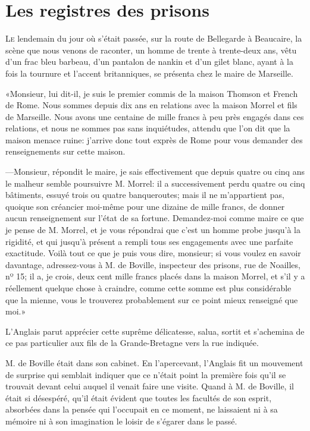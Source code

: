 \chapter{Les registres des prisons}

\lettrine{L}{e} lendemain du jour où s'était passée, sur la route de Bellegarde à Beaucaire, la scène que nous venons de raconter, un homme de trente à trente-deux ans, vêtu d'un frac bleu barbeau, d'un pantalon de nankin et d'un gilet blanc, ayant à la fois la tournure et l'accent britanniques, se présenta chez le maire de Marseille.

«Monsieur, lui dit-il, je suis le premier commis de la maison Thomson et French de Rome. Nous sommes depuis dix ans en relations avec la maison Morrel et fils de Marseille. Nous avons une centaine de mille francs à peu près engagés dans ces relations, et nous ne sommes pas sans inquiétudes, attendu que l'on dit que la maison menace ruine: j'arrive donc tout exprès de Rome pour vous demander des renseignements sur cette maison.

—Monsieur, répondit le maire, je sais effectivement que depuis quatre ou cinq ans le malheur semble poursuivre M. Morrel: il a successivement perdu quatre ou cinq bâtiments, essuyé trois ou quatre banqueroutes; mais il ne m'appartient pas, quoique son créancier moi-même pour une dizaine de mille francs, de donner aucun renseignement sur l'état de sa fortune. Demandez-moi comme maire ce que je pense de M. Morrel, et je vous répondrai que c'est un homme probe jusqu'à la rigidité, et qui jusqu'à présent a rempli tous ses engagements avec une parfaite exactitude. Voilà tout ce que je puis vous dire, monsieur; si vous voulez en savoir davantage, adressez-vous à M. de Boville, inspecteur des prisons, rue de Noailles, nº 15; il a, je crois, deux cent mille francs placés dans la maison Morrel, et s'il y a réellement quelque chose à craindre, comme cette somme est plus considérable que la mienne, vous le trouverez probablement sur ce point mieux renseigné que moi.»

L'Anglais parut apprécier cette suprême délicatesse, salua, sortit et s'achemina de ce pas particulier aux fils de la Grande-Bretagne vers la rue indiquée.

M. de Boville était dans son cabinet. En l'apercevant, l'Anglais fit un mouvement de surprise qui semblait indiquer que ce n'était point la première fois qu'il se trouvait devant celui auquel il venait faire une visite. Quand à M. de Boville, il était si désespéré, qu'il était évident que toutes les facultés de son esprit, absorbées dans la pensée qui l'occupait en ce moment, ne laissaient ni à sa mémoire ni à son imagination le loisir de s'égarer dans le passé.


